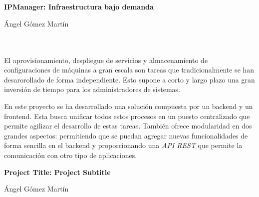 

\cleardoublepage

\chapter*{}
\thispagestyle{empty}

\begin{center}
{\large\bfseries IPManager: Infraestructura bajo demanda}\\
\end{center}
\begin{center}
Ángel Gómez Martín
\end{center}

\\

\vspace{0.7cm}
\\

El aprovisionamiento, despliegue de servicios y almacenamiento de configuraciones de máquinas a gran escala son tareas que tradicionalmente se han desarorollado de forma independiente. Esto supone a corto y largo plazo una gran inversión de tiempo para los administradores de sistemas.

\bigskip
En este proyecto se ha desarrollado una solución compuesta por un backend y un frontend. Esta busca unificar todos estos procesos en un puesto centralizado que permite agilizar el desarrollo de estas tareas. También ofrece modularidad en dos grandes aspectos: permitiendo que se puedan agregar nuevas funcionalidades de forma sencilla en el backend y proporcionando una \textit{API REST} que permite la comunicación con otro tipo de aplicaciones.


\cleardoublepage
\thispagestyle{empty}

\begin{center}
{\large\bfseries Project Title: Project Subtitle}\\
\end{center}
\begin{center}
Ángel Gómez Martín
\end{center}

\\

\vspace{0.7cm}
\\

